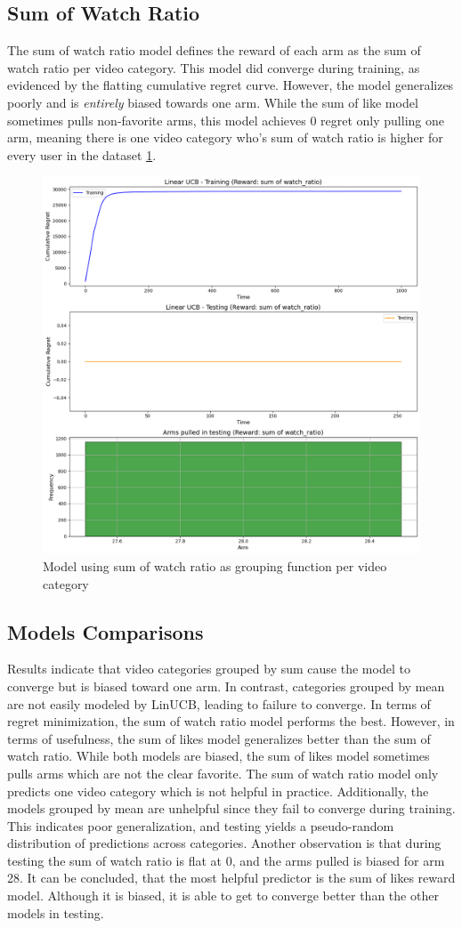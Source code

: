 \subsection{Sum of Watch Ratio}

The sum of watch ratio model defines the reward of each arm as the sum of watch ratio per video category. This model did converge during training, as evidenced by the flatting cumulative regret curve. However, the model generalizes poorly and is \textit{entirely} biased towards one arm. While the sum of like model sometimes pulls non-favorite arms, this model achieves 0 regret only pulling one arm, meaning there is one video category who's sum of watch ratio is higher for every user in the dataset \ref{sum_watchratio}.

\begin{figure}[h]
    \centering
    \includegraphics[width=0.5\linewidth]{summary_report/images/sum_watchratio.png}
    \caption{Model using sum of watch ratio as grouping function per video category}
    \label{sum_watchratio}
\end{figure}

\subsection{Models Comparisons}

Results indicate that video categories grouped by sum cause the model to converge but is biased toward one arm. In contrast, categories grouped by mean are not easily modeled by LinUCB, leading to failure to converge. In terms of regret minimization, the sum of watch ratio model performs the best. However, in terms of usefulness, the sum of likes model generalizes better than the sum of watch ratio. While both models are biased, the sum of likes model sometimes pulls arms which are not the clear favorite. The sum of watch ratio model only predicts one video category which is not helpful in practice. Additionally, the models grouped by mean are unhelpful since they fail to converge during training. This indicates poor generalization, and testing yields a pseudo-random distribution of predictions across categories. Another observation is that during testing the sum of watch ratio is flat at 0, and the arms pulled is biased for arm 28. It can be concluded, that the most helpful predictor is the sum of likes reward model. Although it is biased, it is able to get to converge better than the other models in testing.

